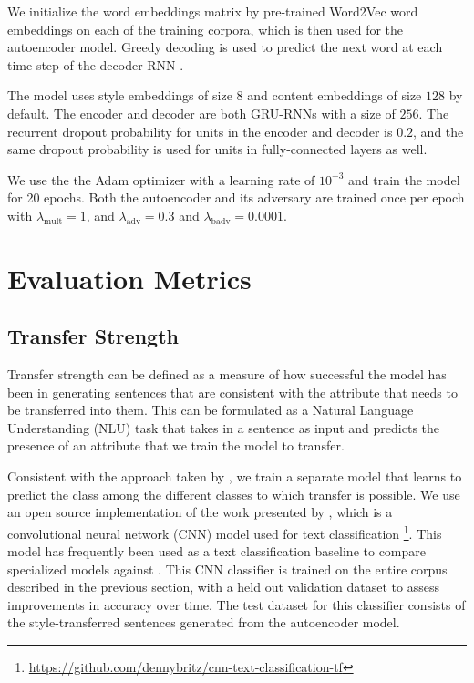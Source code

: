 We initialize the word embeddings matrix by pre-trained Word2Vec word embeddings \citep{mikolov2013efficient,mikolov2013distributed,mikolov2013linguistic} on each of the training corpora, which is then used for the autoencoder model. Greedy decoding  is used to predict the next word at each time-step of the decoder RNN \citep{germann2003greedy}.

The model uses style embeddings of size $8$ and content embeddings of size $128$ by default. The encoder and decoder are both GRU-RNNs with a size of $256$. The recurrent dropout probability for units in the encoder and decoder is $0.2$, and the same dropout probability is used for units in fully-connected layers as well.

We use the the Adam optimizer \citep{kingma2014adam} with a learning rate of $10^{-3}$ and train the model for 20 epochs. Both the autoencoder and its adversary are trained once per epoch with $\lambda_\text{mult} = 1$, and $\lambda_\text{adv} = 0.3$ and $\lambda_\text{badv} = 0.0001$.


\section{Evaluation Metrics} \label{sec:evaluation-metrics}

\subsection{Transfer Strength}

Transfer strength can be defined as a measure of how successful the model has been in generating sentences that are consistent with the attribute that needs to be transferred into them. This can be formulated as a Natural Language Understanding (NLU) task that takes in a sentence as input and predicts the presence of an attribute that we train the model to transfer.

Consistent with the approach taken by \cite{hu2017toward,shen2017style,fu2017style}, we train a separate model that learns to predict the class among the different classes to which transfer is possible. We use an open source implementation of the work presented by \cite{kim2014convolutional}, which is a convolutional neural network (CNN) model used for text classification \footnote{\url{https://github.com/dennybritz/cnn-text-classification-tf}}. This model has frequently been used as a text classification baseline to compare specialized models against \citep{tai2015improved,kiros2015skip,zhang2015character}. This CNN classifier is trained on the entire corpus described in the previous section, with a held out validation dataset to assess improvements in accuracy over time. The test dataset for this classifier consists of the style-transferred sentences generated from the autoencoder model.

